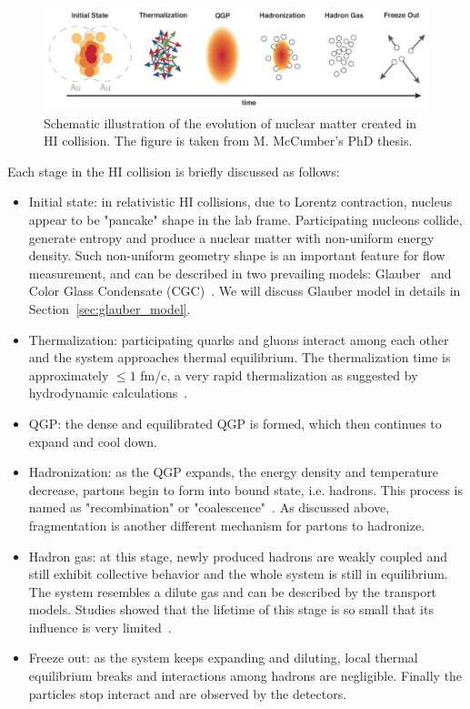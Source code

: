 \begin{figure}[H]
\centering
\includegraphics[width=.95\linewidth]{figs/chapter_intro/QGP_evolution.png}
\caption{Schematic illustration of the evolution of nuclear matter created in HI collision. The figure is taken from M. McCumber's PhD thesis.}
\label{fig:intro_QGP_evolution}
\end{figure}

Each stage in the HI collision is briefly discussed as follows:
\begin{itemize}
\item Initial state: in relativistic HI collisions, due to Lorentz contraction, nucleus appear to be "pancake" shape in the lab frame. Participating nucleons collide, generate entropy and produce a nuclear matter with non-uniform energy density. Such non-uniform geometry shape is an important feature for flow measurement, and can be described in two prevailing models: Glauber~\cite{Glauber:1955qq} and Color Glass Condensate (CGC)~\cite{Kharzeev:2002ei}. We will discuss Glauber model in details in Section~\ref{sec:glauber_model}.
\item Thermalization: participating quarks and gluons interact among each other and the system approaches thermal equilibrium. The thermalization time is approximately $\leq 1$ fm/c, a very rapid thermalization as suggested by hydrodynamic calculations~\cite{Adare:2009qk}.
\item QGP: the dense and equilibrated QGP is formed, which then continues to expand and cool down.
\item Hadronization: as the QGP expands, the energy density and temperature decrease, partons begin to form into bound state, i.e. hadrons. This process is named as "recombination" or "coalescence"~\cite{Fries:2008hs}. As discussed above, fragmentation is another different mechanism for partons to hadronize.
\item Hadron gas: at this stage, newly produced hadrons are weakly coupled and still exhibit collective behavior and the whole system is still in equilibrium. The system resembles a dilute gas and can be described by the transport models. Studies showed that the lifetime of this stage is so small that its influence is very limited~\cite{Afanasiev:2007tv}.
\item Freeze out: as the system keeps expanding and diluting, local thermal equilibrium breaks and interactions among hadrons are negligible. Finally the particles stop interact and are observed by the detectors.
\end{itemize}

